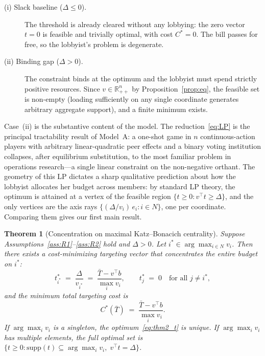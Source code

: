 \documentclass[11pt,letterpaper]{article}
\theoremstyle{plain}
\newtheorem{theorem}{Theorem}
\theoremstyle{definition}
\theoremstyle{remark}
\begin{document}
\begin{description}
\item[(i) Slack baseline ($\Delta \leq 0$).] The threshold is already cleared without any lobbying: the zero vector $t = 0$ is feasible and trivially optimal, with cost $C^* = 0$. The bill passes for free, so the lobbyist's problem is degenerate.

\item[(ii) Binding gap ($\Delta > 0$).] The constraint binds at the optimum and the lobbyist must spend strictly positive resources. Since $v \in \mathbb{R}^n_{++}$ by Proposition~\ref{prop:eq}, the feasible set is non-empty (loading sufficiently on any single coordinate generates arbitrary aggregate support), and a finite minimum exists.
\end{description}

Case~(ii) is the substantive content of the model. The reduction~\eqref{eq:LP} is the principal tractability result of Model~A: a one-shot game in $n$ continuous-action players with arbitrary linear-quadratic peer effects and a binary voting institution collapses, after equilibrium substitution, to the most familiar problem in operations research---a single linear constraint on the non-negative orthant. The geometry of this LP dictates a sharp qualitative prediction about how the lobbyist allocates her budget across members: by standard LP theory, the optimum is attained at a vertex of the feasible region $\{t \geq 0 : v^\top t \geq \Delta\}$, and the only vertices are the axis rays $\{(\Delta/v_i)\, e_i : i \in N\}$, one per coordinate. Comparing them gives our first main result.

\begin{theorem}[Concentration on maximal Katz--Bonacich centrality]\label{thm:concentration}
Suppose Assumptions~\ref{ass:R1}--\ref{ass:R2} hold and $\Delta > 0$. Let $i^* \in \arg\max_{i \in N} v_i$. Then there exists a cost-minimizing targeting vector that concentrates the entire budget on $i^*$:
\begin{equation}
t^*_{i^*} \;=\; \frac{\Delta}{v_{i^*}} \;=\; \frac{\bar T - v^\top b}{\max_{i} v_i}, \qquad t^*_j \;=\; 0 \quad\text{for all } j \neq i^*,
\label{eq:thm2_t}
\end{equation}
and the minimum total targeting cost is
\begin{equation}
C^*(\bar T) \;=\; \frac{\bar T - v^\top b}{\max_{i} v_i}.
\label{eq:thm2_cost}
\end{equation}
If $\arg\max_i v_i$ is a singleton, the optimum~\eqref{eq:thm2_t} is unique. If $\arg\max_i v_i$ has multiple elements, the full optimal set is $\{t \geq 0 : \mathrm{supp}(t) \subseteq \arg\max_i v_i,\; v^\top t = \Delta\}$.
\end{theorem}
\end{document}
